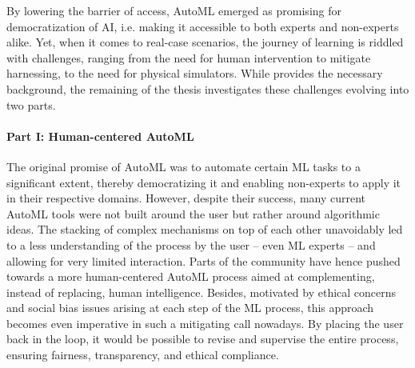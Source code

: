 \documentclass[a4paper,12pt,times,numbered,print,index]{Classes/PhDThesisPSnPDF}
\begin{document}
By lowering the barrier of access, AutoML emerged as promising for democratization of AI, i.e. making it accessible to both experts and non-experts alike.
Yet, when it comes to real-case scenarios, the journey of learning is riddled with challenges, ranging from the need for human intervention to mitigate harnessing, to the need for physical simulators.
While  provides the necessary background, the remaining of the thesis investigates these challenges evolving into two parts.




\paragraph{Part I: Human-centered AutoML}

The original promise of AutoML was to automate certain ML tasks to a significant extent, thereby democratizing it and enabling non-experts to apply it in their respective domains.
However, despite their success, many current AutoML tools were not built around the user but rather around algorithmic ideas.
The stacking of complex mechanisms on top of each other unavoidably led to a less understanding of the process by the user -- even ML experts -- and allowing for very limited interaction.
Parts of the community have hence pushed towards a more human-centered AutoML process aimed at complementing, instead of replacing, human intelligence.
Besides, motivated by ethical concerns and social bias issues arising at each step of the ML process, this approach becomes even imperative in such a mitigating call nowadays.
By placing the user back in the loop, it would be possible to revise and supervise the entire process, ensuring fairness, transparency, and ethical compliance.
\end{document}

